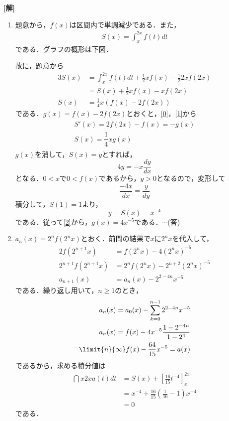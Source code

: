 \documentclass[a4j]{jarticle}
\begin{document}
\setlength{\columnseprule}{0.4pt}
\begin{multicols}{2}
{\bf[解]} 
     \begin{enumerate}[(1)]
     \item 題意から，$f(x)$は区間内で単調減少である．また，
          \begin{align}
          S(x)=\int_x^{2x}f(t)dt\label{0}
          \end{align} 
     である．グラフの概形は下図．
          \begin{center}
          \scalebox{0.7}{}
          \end{center}
     故に，題意から
          \begin{align}
          3S(x)&=\int_x^{2x}f(t)dt+\frac{1}{2}xf(x)-\frac{1}{2}2xf(2x) \nonumber\\
          &=S(x)+\frac{1}{2}xf(x)-xf(2x) \nonumber\\
          S(x)&=\frac{1}{4}x(f(x)-2f(2x)) \label{1}
          \end{align}
     である．$g(x)=f(x)-2f(2x)$とおくと，\eqref{0}，\eqref{1}から
          \begin{align}
               \begin{array}{l}
               S'(x)=2f(2x)-f(x)=-g(x) \\
               S(x)=\dfrac{1}{4}xg(x) 
               \end{array}\label{2}
          \end{align}
     $g(x)$を消して，$S(x)=y$とすれば，
          \[4y=-x\frac{dy}{dx} \]
     となる．$0<x$で$0<f(x)$であるから，$y>0$となるので，変形して
          \[\frac{-4x}{dx}=\frac{y}{dy}\]
     積分して，$S(1)=1$より，
          \[y=S(x)=x^{-4}\]
     である．従って\eqref{2}から，$g(x)=4x^{-5}$である．$\cdots$(答)
     
     \item $a_n(x)=2^nf(2^nx)$とおく．前問の結果で$x$に$2^nx$を代入して，
          \begin{align*}
          2f(2^{n+1}x)&=f(2^nx)-4(2^nx)^{-5} \\
          2^{n+1}f(2^{n+1}x)&=2^nf(2^nx)-2^{n+2}(2^nx)^{-5} \\
          a_{n+1}(x)&=a_n(x)-2^{2-4n}x^{-5}
          \end{align*}
     である．繰り返し用いて，$n\ge1$のとき，
          \begin{align*}
          a_n(x)=a_0(x)-\sum_{k=0}^{n-1}2^{2-4n}x^{-5} \\
          a_n(x)=f(x)-4x^{-5}\frac{1-2^{-4n}}{1-2^4} \\
          \limit{n}{\infty}f(x)-\frac{64}{15}x^{-5}=a(x)
          \end{align*}
     であるから，求める積分値は
           \begin{align*}
           \dint{x}{2x}a(t)dt&=S(x)+\left[\frac{16}{15}t^{-4}\right]_x^{2x} \\
           &=x^{-4}+\frac{16}{15}\left(\frac{1}{16}-1\right)x^{-4} \\
           &=0
           \end{align*}
      である．
      

\end{enumerate}
\end{multicols}
\end{document}
